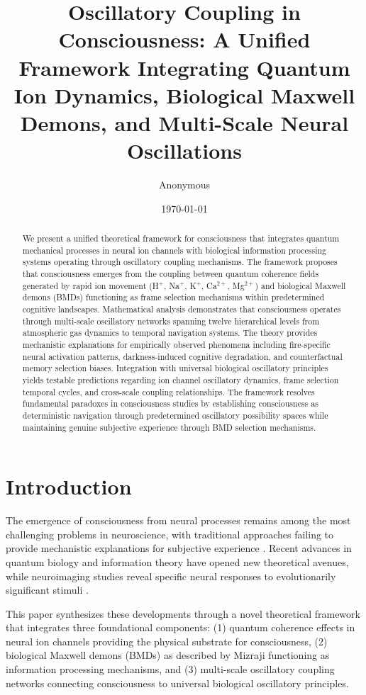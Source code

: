 \documentclass[12pt,a4paper]{article}
\title{Oscillatory Coupling in Consciousness: A Unified Framework Integrating Quantum Ion Dynamics, Biological Maxwell Demons, and Multi-Scale Neural Oscillations}
\author{Anonymous}
\date{\today}
\begin{document}
\maketitle

\begin{abstract}
We present a unified theoretical framework for consciousness that integrates quantum mechanical processes in neural ion channels with biological information processing systems operating through oscillatory coupling mechanisms. The framework proposes that consciousness emerges from the coupling between quantum coherence fields generated by rapid ion movement (H$^+$, Na$^+$, K$^+$, Ca$^{2+}$, Mg$^{2+}$) and biological Maxwell demons (BMDs) functioning as frame selection mechanisms within predetermined cognitive landscapes. Mathematical analysis demonstrates that consciousness operates through multi-scale oscillatory networks spanning twelve hierarchical levels from atmospheric gas dynamics to temporal navigation systems. The theory provides mechanistic explanations for empirically observed phenomena including fire-specific neural activation patterns, darkness-induced cognitive degradation, and counterfactual memory selection biases. Integration with universal biological oscillatory principles yields testable predictions regarding ion channel oscillatory dynamics, frame selection temporal cycles, and cross-scale coupling relationships. The framework resolves fundamental paradoxes in consciousness studies by establishing consciousness as deterministic navigation through predetermined oscillatory possibility spaces while maintaining genuine subjective experience through BMD selection mechanisms.
\end{abstract}

\section{Introduction}

The emergence of consciousness from neural processes remains among the most challenging problems in neuroscience, with traditional approaches failing to provide mechanistic explanations for subjective experience \citep{chalmers1995facing}. Recent advances in quantum biology \citep{lambert2013quantum} and information theory \citep{tononi2008consciousness} have opened new theoretical avenues, while neuroimaging studies reveal specific neural responses to evolutionarily significant stimuli \citep{morris1998conscious}.

This paper synthesizes these developments through a novel theoretical framework that integrates three foundational components: (1) quantum coherence effects in neural ion channels providing the physical substrate for consciousness, (2) biological Maxwell demons (BMDs) as described by Mizraji \citep{mizraji2021biological} functioning as information processing mechanisms, and (3) multi-scale oscillatory coupling networks connecting consciousness to universal biological oscillatory principles.
\end{document}
